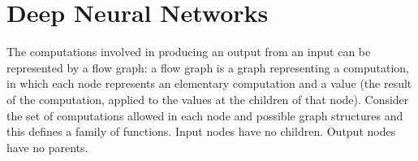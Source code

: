 \section{Deep Neural Networks}
\label{sec:theory_dnn}

The computations involved in producing an output from an input can be represented by a flow graph: a flow graph is a graph representing a computation, in which each node represents an elementary computation and a value (the result of the computation, applied to the values at the children of that node). Consider the set of computations allowed in each node and possible graph structures and this defines a family of functions. Input nodes have no children. Output nodes have no parents.
